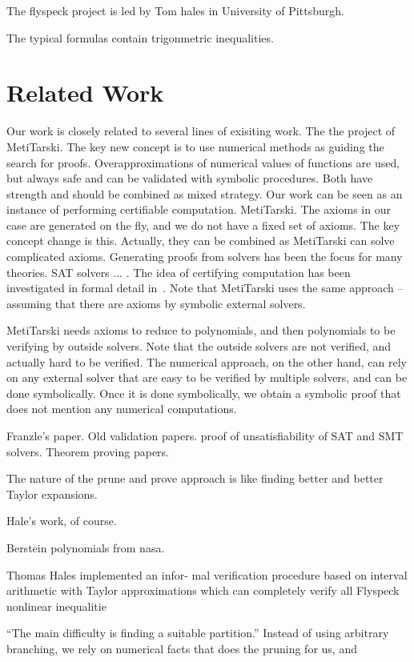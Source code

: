 \documentclass[envcountsect]{llncs}
\begin{document}
The flyspeck project is led by Tom hales in University of Pittsburgh. 

The typical formulas contain trigonmetric inequalities. 


\section{Related Work}

Our work is closely related to several lines of exisiting work. The the
project of MetiTarski. The key new concept is to use numerical methods as
guiding the search for proofs. Overapproximations of numerical values of
functions are used, but always safe and can be validated with symbolic
procedures. Both have strength and should be combined as mixed strategy. Our
work can be seen as an instance of performing certifiable computation.
MetiTarski. The axioms in our case are generated on the fly, and we do not have
a fixed set of axioms. The key concept change is this. Actually, they can be
combined as MetiTarski can solve
complicated axioms. 
Generating proofs from solvers has been the focus for
many theories. SAT solvers ... . The idea of certifying computation has been
investigated in formal detail in~\cite{}. Note that MetiTarski uses the same
approach -- assuming that there are axioms by symbolic external solvers. 

MetiTarski needs axioms to reduce to polynomials, and then polynomials to be
verifying by outside solvers. Note that the outside solvers are not verified,
and actually hard to be verified. The numerical approach, on the other hand,
can rely on any external solver that are easy to be verified by multiple
solvers, and can be done symbolically. Once it is done symbolically, we obtain
a symbolic proof that does not mention any numerical computations. 

Franzle's paper. Old validation papers. proof of unsatisfiability of SAT and
SMT solvers. Theorem proving papers.

The nature of the prune and prove approach is like finding better and better
Taylor expansions. 

Hale's work, of course. 

Berstein polynomials from nasa. 

Thomas Hales implemented an infor-
mal verification procedure based on interval arithmetic with Taylor
approximations which
can completely verify all Flyspeck nonlinear inequalitie

``The main difficulty is finding a suitable partition.'' Instead of using
arbitrary branching, we rely on numerical facts that does the pruning for us,
and 
\end{document}
